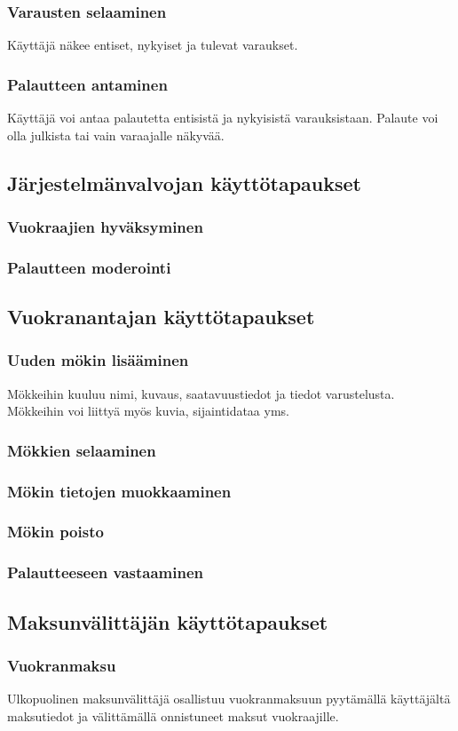 \subsubsection*{Varausten selaaminen}
Käyttäjä näkee entiset, nykyiset ja tulevat varaukset.

\subsubsection*{Palautteen antaminen}
Käyttäjä voi antaa palautetta entisistä ja nykyisistä varauksistaan. Palaute voi olla julkista tai vain varaajalle näkyvää.

\subsection{Järjestelmänvalvojan käyttötapaukset}
\subsubsection*{Vuokraajien hyväksyminen}
\subsubsection*{Palautteen moderointi}

\subsection{Vuokranantajan käyttötapaukset}
\subsubsection*{Uuden mökin lisääminen}
Mökkeihin kuuluu nimi, kuvaus, saatavuustiedot ja tiedot varustelusta. Mökkeihin voi liittyä myös kuvia, sijaintidataa yms.
\subsubsection*{Mökkien selaaminen}
\subsubsection*{Mökin tietojen muokkaaminen}
\subsubsection*{Mökin poisto}
\subsubsection*{Palautteeseen vastaaminen}

\subsection{Maksunvälittäjän käyttötapaukset}
\subsubsection*{Vuokranmaksu}
Ulkopuolinen maksunvälittäjä osallistuu vuokranmaksuun pyytämällä käyttäjältä maksutiedot ja välittämällä onnistuneet maksut vuokraajille.